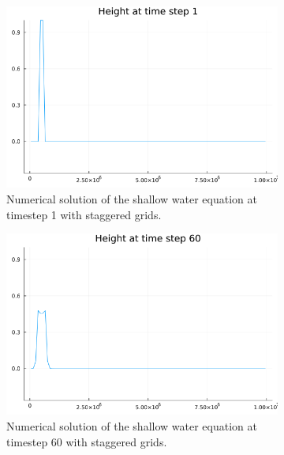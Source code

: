 \begin{figure}[h]
    \begin{subfigure}[b]{0.3\textwidth}
        \includegraphics[width=\textwidth]{./images/height-swe1d-staggered-grid-1.png}
        \caption{Numerical solution of the shallow water equation at timestep 1 with staggered grids.}
        \label{fig:staggered1}
    \end{subfigure}
    \hfill
    \begin{subfigure}[b]{0.3\textwidth}
        \includegraphics[width=\textwidth]{./images/height-swe1d-staggered-grid-60.png}
        \caption{Numerical solution of the shallow water equation at timestep 60 with staggered grids.}
        \label{fig:staggered60}
    \end{subfigure}
    \hfill
    \begin{subfigure}[b]{0.3\textwidth}

\end{subfigure}
\end{figure}
